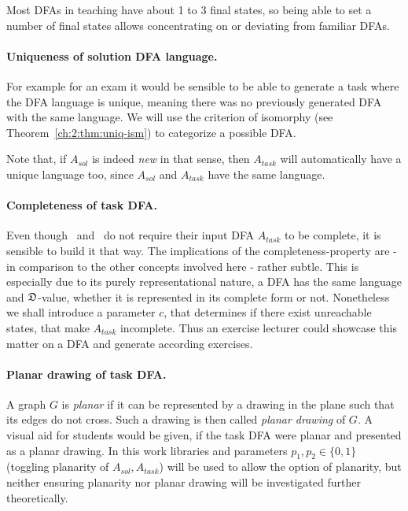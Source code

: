 Most DFAs in teaching have about 1 to 3 final states, so being able to set a number of final states allows concentrating on or deviating from familiar DFAs.

\paragraph*{Uniqueness of solution DFA language.}

For example for an exam it would be sensible to be able to generate a task where the DFA language is unique, meaning there was no previously generated DFA with the same language. We will use the criterion of isomorphy (see Theorem~\ref{ch:2:thm:uniq-ism}) to categorize a possible DFA.

Note that, if $A_{sol}$ is indeed \emph{new} in that sense, then $A_{task}$ will automatically have a unique language too, since $A_{sol}$ and $A_{task}$ have the same language.

\paragraph*{Completeness of task DFA.}

Even though \CompUnr\ and \RemUnr\ do not require their input DFA $A_{task}$ to be complete, it is sensible to build it that way. The implications of the completeness-property are - in comparison to the other concepts involved here - rather subtle. This is especially due to its purely representational nature, a DFA has the same language and $\mathfrak{D}$-value, whether it is represented in its complete form or not. Nonetheless we shall introduce a parameter $c$, that determines if there exist unreachable states, that make $A_{task}$ incomplete. Thus an exercise lecturer could showcase this matter on a DFA and generate according exercises.

\paragraph*{Planar drawing of task DFA.}

A graph $G$ is \emph{planar} if it can be represented by a drawing in the plane such that its edges do not cross. Such a drawing is then called \emph{planar drawing} of $G$. A visual aid for students would be given, if the task DFA were planar and presented as a planar drawing. In this work libraries and parameters $p_1, p_2 \in \{0,1\}$ (toggling planarity of $A_{sol}, A_{task}$) will be used to allow the option of planarity, but neither ensuring planarity nor planar drawing will be investigated further theoretically.

